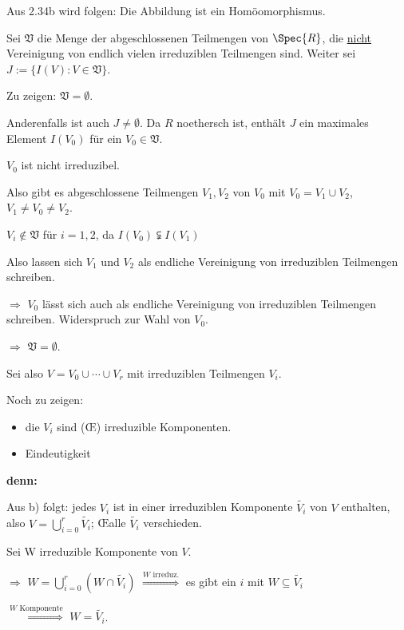 \begin{DefProp}
\begin{Bew}
\begin{enumerate}
Aus 2.34b wird folgen: Die Abbildung ist ein Hom\"oomorphismus.

Sei $\mathfrak{V}$ die Menge der abgeschlossenen Teilmengen von $\Spec{R}$, die
\underline{nicht} Vereinigung von endlich vielen irreduziblen Teilmengen sind.
Weiter sei $J := \{ I(V) : V \in \mathfrak{V} \}$.

Zu zeigen: $\mathfrak{V} = \emptyset$.

Anderenfalls ist auch $J \neq \emptyset$. Da $R$ noethersch ist, enth\"alt $J$ ein maximales Element $I(V_0)$ f\"ur ein $V_0 \in \mathfrak{V}$.

$V_0$ ist nicht irreduzibel.

Also gibt es abgeschlossene Teilmengen $V_1, V_2$ von $V_0$ mit $V_0 = V_1 \cup V_2$, $V_1 \neq V_0 \neq V_2$.

$V_i \notin \mathfrak{V}$ f\"ur $i = 1,2$, da $I(V_0) \subsetneqq I(V_1)$

Also lassen sich $V_1$ und $V_2$ als endliche Vereinigung von irreduziblen Teilmengen schreiben.

$\Rightarrow$ $V_0$ l\"asst sich auch als endliche Vereinigung von irreduziblen Teilmengen schreiben. Widerspruch zur Wahl von $V_0$.

$\Rightarrow$ $\mathfrak{V} = \emptyset$.
\bigskip

Sei also $V = V_0 \cup \cdots \cup V_r$ mit irreduziblen Teilmengen $V_i$.

Noch zu zeigen: 
\begin{itemize}
\item die $V_i$ sind (\OE) irreduzible Komponenten.
\item Eindeutigkeit
\end{itemize}

\textbf{denn:}

Aus b) folgt: jedes $V_i$ ist in einer irreduziblen Komponente
$\widetilde{V_i}$ von $V$ enthalten, also $V = \bigcup_{i=0}^r
\widetilde{V_i}$; \OE  alle $\widetilde{V_i}$ verschieden.

Sei W irreduzible Komponente von $V$.

$\Rightarrow$ $W = \bigcup_{i=0}^r (W \cap \widetilde{V_i})$ $\overset{W \text{ irreduz.}}\Rightarrow$ es gibt ein $i$ mit $W \subseteq \widetilde{V_i}$

$\overset{W \text{ Komponente}}\Rightarrow$ $W = \widetilde{V_i}$.

\end{enumerate}
\end{Bew}

\end{DefProp}

